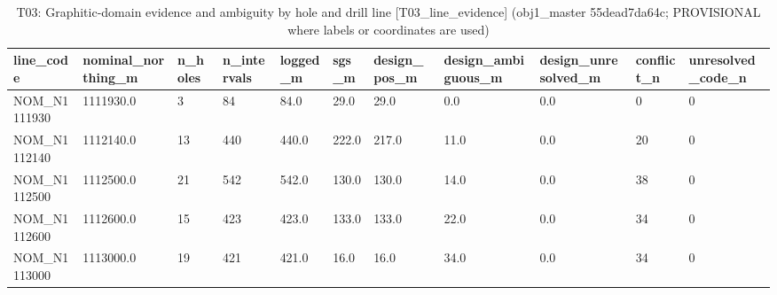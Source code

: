 \begin{table}[htbp]
\centering
\caption{T03: Graphitic-domain evidence and ambiguity by hole and drill line [T03\_line\_evidence] (obj1\_master 55dead7da64c; PROVISIONAL where labels or coordinates are used)}
\begin{tabular}{lllllllllll}
\toprule
line\_code & nominal\_northing\_m & n\_holes & n\_intervals & logged\_m & sgs\_m & design\_pos\_m & design\_ambiguous\_m & design\_unresolved\_m & conflict\_n & unresolved\_code\_n \\
\midrule
NOM\_N1111930 & 1111930.0 & 3 & 84 & 84.0 & 29.0 & 29.0 & 0.0 & 0.0 & 0 & 0 \\
NOM\_N1112140 & 1112140.0 & 13 & 440 & 440.0 & 222.0 & 217.0 & 11.0 & 0.0 & 20 & 0 \\
NOM\_N1112500 & 1112500.0 & 21 & 542 & 542.0 & 130.0 & 130.0 & 14.0 & 0.0 & 38 & 0 \\
NOM\_N1112600 & 1112600.0 & 15 & 423 & 423.0 & 133.0 & 133.0 & 22.0 & 0.0 & 34 & 0 \\
NOM\_N1113000 & 1113000.0 & 19 & 421 & 421.0 & 16.0 & 16.0 & 34.0 & 0.0 & 34 & 0 \\
\bottomrule
\end{tabular}
\end{table}
